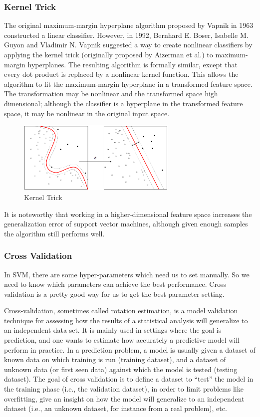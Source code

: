 \documentclass[conference]{IEEEtran}
\begin{document}
\subsubsection{Kernel Trick}
The original maximum-margin hyperplane algorithm proposed by Vapnik in 1963 constructed a linear classifier. However, in 1992, Bernhard E. Boser, Isabelle M. Guyon and Vladimir N. Vapnik suggested a way to create nonlinear classifiers by applying the kernel trick (originally proposed by Aizerman et al.\cite{Aizerman67theoretical}) to maximum-margin hyperplanes.\cite{Boser92atraining} The resulting algorithm is formally similar, except that every dot product is replaced by a nonlinear kernel function. This allows the algorithm to fit the maximum-margin hyperplane in a transformed feature space. The transformation may be nonlinear and the transformed space high dimensional; although the classifier is a hyperplane in the transformed feature space, it may be nonlinear in the original input space.

\begin{figure}[H]
\centering
\includegraphics[width=3in]{svm2.png}
\caption{Kernel Trick}
\end{figure}

It is noteworthy that working in a higher-dimensional feature space increases the generalization error of support vector machines, although given enough samples the algorithm still performs well.\cite{NIPS2012-4500}
\subsubsection{Cross Validation}
In SVM, there are some hyper-parameters which need us to set manually. So we need to know which parameters can achieve the best performance. Cross validation is a pretty good way for us to get the best parameter setting.

Cross-validation, sometimes called rotation estimation, is a model validation technique for assessing how the results of a statistical analysis will generalize to an independent data set. It is mainly used in settings where the goal is prediction, and one wants to estimate how accurately a predictive model will perform in practice. In a prediction problem, a model is usually given a dataset of known data on which training is run (training dataset), and a dataset of unknown data (or first seen data) against which the model is tested (testing dataset). The goal of cross validation is to define a dataset to ``test'' the model in the training phase (i.e., the validation dataset), in order to limit problems like overfitting, give an insight on how the model will generalize to an independent dataset (i.e., an unknown dataset, for instance from a real problem), etc.
\end{document}
